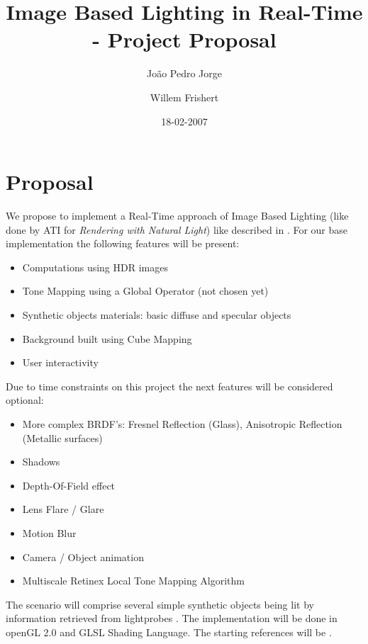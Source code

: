 \documentclass{article}
\title{Image Based Lighting in Real-Time - Project Proposal}
\author{Jo\~{a}o Pedro Jorge \and Willem Frishert}
\date{18-02-2007}
\begin{document}
\maketitle

\section{Proposal}

We propose to implement a Real-Time approach of Image Based Lighting (like done by ATI for \textit{Rendering with Natural Light}) like described in \cite{bib:HDRBook}. For our base implementation the following features will be present:

\begin{itemize}
	\item Computations using HDR images
	\item Tone Mapping using a Global Operator (not chosen yet)
	\item Synthetic objects materials: basic diffuse and specular objects
	\item Background built using Cube Mapping
	\item User interactivity
\end{itemize}
Due to time constraints on this project the next features will be considered optional:
\begin{itemize}
	\item More complex BRDF's: Fresnel Reflection (Glass), Anisotropic Reflection 
(Metallic surfaces)
	\item Shadows
	\item Depth-Of-Field effect
	\item Lens Flare / Glare
	\item Motion Blur
	\item Camera / Object animation
	\item Multiscale Retinex Local Tone Mapping Algorithm
\end{itemize}

The scenario will comprise several simple synthetic objects being lit by information retrieved from lightprobes \cite{bib:HDRBook}. The implementation will be done in openGL 2.0 and GLSL Shading Language.
The starting references will be \cite{bib:FBOs, bib:HDRTM, bib:HDRTexturing, bib:RTIBL, bib:HDRBook}.
\end{document}
